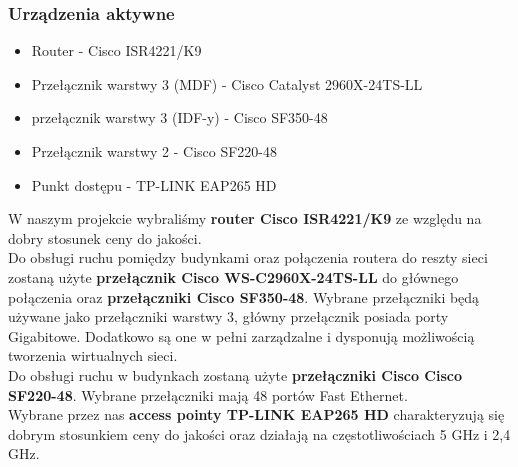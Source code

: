\documentclass[a4paper,12pt]{extarticle}  %
\begin{document}
\subsubsection{Urządzenia aktywne}
\begin{itemize}
	\item Router - Cisco ISR4221/K9
	\item Przełącznik warstwy 3 (MDF) - Cisco Catalyst 2960X-24TS-LL
	\item przełącznik warstwy 3 (IDF-y) - Cisco SF350-48
	\item Przełącznik warstwy 2 - Cisco SF220-48
	\item Punkt dostępu - TP-LINK EAP265 HD
\end{itemize}
W naszym projekcie wybraliśmy \textbf{router Cisco ISR4221/K9} ze względu na dobry stosunek 
ceny do jakości. \\

Do obsługi ruchu pomiędzy budynkami oraz połączenia routera do reszty sieci zostaną użyte 
\textbf{przełącznik Cisco WS-C2960X-24TS-LL} do głównego połączenia oraz \textbf{przełączniki Cisco SF350-48}. 
Wybrane przełączniki będą używane jako przełączniki warstwy 3, główny przełącznik posiada porty Gigabitowe.
Dodatkowo są one w pełni zarządzalne i dysponują możliwością tworzenia wirtualnych sieci.\\

Do obsługi ruchu w budynkach zostaną użyte \textbf{przełączniki Cisco Cisco SF220-48}.
Wybrane przełączniki mają 48 portów Fast Ethernet.\\

Wybrane przez nas \textbf{access pointy TP-LINK EAP265 HD} charakteryzują się dobrym stosunkiem ceny 
do jakości oraz działają na częstotliwościach 5 GHz i 2,4 GHz.







\end{document}
